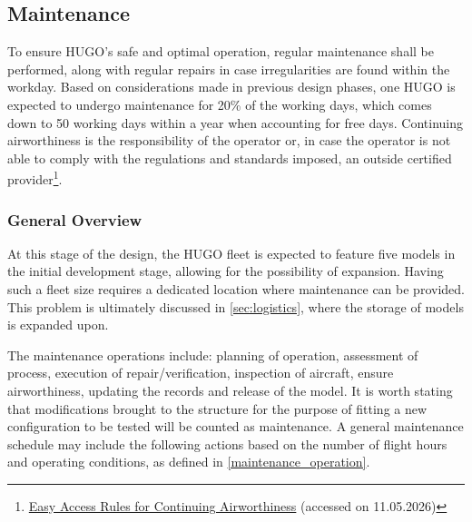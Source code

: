 \subsection{Maintenance}
\label{subsec:maintenance}
To ensure HUGO's safe and optimal operation, regular maintenance shall be performed, along with regular repairs in case irregularities are found within the workday. Based on considerations made in previous design phases, one HUGO is expected to undergo maintenance for 20\% of the working days, which comes down to 50 working days within a year when accounting for free days. Continuing airworthiness is the responsibility of the operator or, in case the operator is not able to comply with the regulations and standards imposed, an outside certified provider\footnote{\label{Easa_Maintenance}\href{https://www.easa.europa.eu/en/document-library/easy-access-rules/online-publications/easy-access-rules-continuing-airworthiness?erules-id=ERULES-1963177438-693}{Easy Access Rules for Continuing Airworthiness} (accessed on 11.05.2026)}.

\subsubsection*{General Overview}
At this stage of the design, the HUGO fleet is expected to feature five models in the initial development stage, allowing for the possibility of expansion. Having such a fleet size requires a dedicated location where maintenance can be provided. This problem is ultimately discussed in \autoref{sec:logistics}, where the storage of models is expanded upon.

The maintenance operations include: planning of operation, assessment of process, execution of repair/verification, inspection of aircraft, ensure airworthiness, updating the records and release of the model. It is worth stating that modifications brought to the structure for the purpose of fitting a new configuration to be tested will be counted as maintenance. A general maintenance schedule may include the following actions based on the number of flight hours and operating conditions, as defined in \autoref{maintenance_operation}.


